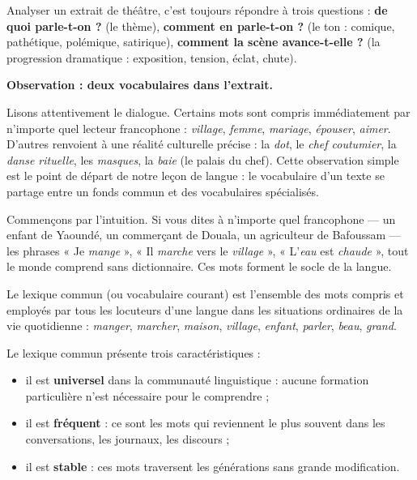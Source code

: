 \documentclass[11pt]{article}
\newcommand{\cle}[1]{{\popxbold\color{popdark}#1}}
\newcounter{popsec}
\newcounter{popsub}
\newcommand{\courssub}[1]{%
  \stepcounter{popsub}%
  \par\vspace{9pt}\noindent{\popxbold\fontsize{11.5}{13}\selectfont\color{popink}{\color{poporange}\thepopsec.\thepopsub}\hspace{6pt}#1}\par\nopagebreak\vspace{4pt}
}
\begin{document}
\begin{aretenir}
Analyser un extrait de théâtre, c'est toujours répondre à trois questions : \textbf{de quoi parle-t-on ?} (le thème), \textbf{comment en parle-t-on ?} (le ton : comique, pathétique, polémique, satirique), \textbf{comment la scène avance-t-elle ?} (la progression dramatique : exposition, tension, éclat, chute).
\end{aretenir}

\textbf{Observation : deux vocabulaires dans l'extrait.}\par

Lisons attentivement le dialogue. Certains mots sont compris immédiatement par n'importe quel lecteur francophone : \emph{village}, \emph{femme}, \emph{mariage}, \emph{épouser}, \emph{aimer}. D'autres renvoient à une réalité culturelle précise : la \emph{dot}, le \emph{chef coutumier}, la \emph{danse rituelle}, les \emph{masques}, la \emph{baie} (le palais du chef). Cette observation simple est le point de départ de notre leçon de langue : le vocabulaire d'un texte se partage entre un fonds commun et des vocabulaires spécialisés.

\courssub{Le lexique commun}

Commençons par l'intuition. Si vous dites à n'importe quel francophone — un enfant de Yaoundé, un commerçant de Douala, un agriculteur de Bafoussam — les phrases « Je \emph{mange} », « Il \emph{marche} vers le \emph{village} », « L'\emph{eau} est \emph{chaude} », tout le monde comprend sans dictionnaire. Ces mots forment le socle de la langue.

\begin{definition}
Le \cle{lexique commun} (ou vocabulaire courant) est l'ensemble des mots compris et employés par tous les locuteurs d'une langue dans les situations ordinaires de la vie quotidienne : \emph{manger}, \emph{marcher}, \emph{maison}, \emph{village}, \emph{enfant}, \emph{parler}, \emph{beau}, \emph{grand}.
\end{definition}

Le lexique commun présente trois caractéristiques :

\begin{itemize}
\item il est \textbf{universel} dans la communauté linguistique : aucune formation particulière n'est nécessaire pour le comprendre ;
\item il est \textbf{fréquent} : ce sont les mots qui reviennent le plus souvent dans les conversations, les journaux, les discours ;
\item il est \textbf{stable} : ces mots traversent les générations sans grande modification.
\end{itemize}
\end{document}

